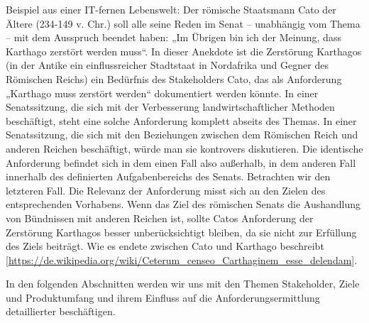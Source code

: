 Beispiel aus einer IT-fernen Lebenswelt: Der römische Staatsmann Cato der Ältere (234-149 v. Chr.) soll alle seine Reden im Senat -- unabhängig vom Thema -- mit dem Ausspruch beendet haben: „Im Übrigen bin ich der Meinung, dass Karthago zerstört werden muss“. In dieser Anekdote ist die Zerstörung Karthagos (in der Antike ein einflussreicher Stadtstaat in Nordafrika und Gegner des Römischen Reichs) ein Bedürfnis des Stakeholders Cato, das als Anforderung „Karthago muss zerstört werden“ dokumentiert werden könnte. In einer Senatssitzung, die sich mit der Verbesserung landwirtschaftlicher Methoden beschäftigt, steht eine solche Anforderung komplett abseits des Themas. In einer Senatssitzung, die sich mit den Beziehungen zwischen dem Römischen Reich und anderen Reichen beschäftigt, würde man sie kontrovers diskutieren. Die identische Anforderung befindet sich in dem einen Fall also außerhalb, in dem anderen Fall innerhalb des definierten Aufgabenbereichs des Senats. Betrachten wir den letzteren Fall. Die Relevanz der Anforderung misst sich an den Zielen des entsprechenden Vorhabens. Wenn das Ziel des römischen Senats die Aushandlung von Bündnissen mit anderen Reichen ist, sollte Catos Anforderung der Zerstörung Karthagos besser unberücksichtigt bleiben, da sie nicht zur Erfüllung des Ziels beiträgt. Wie es endete zwischen Cato und Karthago beschreibt \linebreak 
{\small [\url{https://de.wikipedia.org/wiki/Ceterum_censeo_Carthaginem_esse_delendam}]}.

In den folgenden Abschnitten werden wir uns mit den Themen Stakeholder, Ziele und Produktumfang und ihrem Einfluss auf die Anforderungsermittlung detaillierter beschäftigen. 